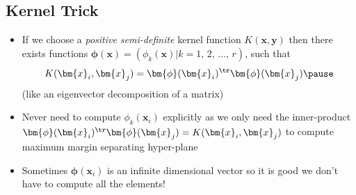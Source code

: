 
\begin{slide}
\section[-1]{Kernel Trick}

\begin{PauseHighLight}
  \begin{itemize}
  \item If we choose a \emph{positive semi-definite} kernel function
    $K(\bm{x}, \bm{y})$ then there exists functions
    $\bm{\phi}(\bm{x}) = (\phi_k(\bm{x})|k=1,\,2,\,\ldots,\,r)$,
    such that
    \begin{align*}
      K(\bm{x}_i, \bm{x}_j) = \bm{\phi}(\bm{x}_i)^\tr
      \bm{\phi}(\bm{x}_j) \pause
    \end{align*}
    (like an eigenvector decomposition of a matrix)\pause
  \item Never need to compute $\phi_k(\bm{x}_i)$ explicitly as we only
    need the inner-product $\bm{\phi}(\bm{x}_i)^\tr
      \bm{\phi}(\bm{x}_j) = K(\bm{x}_i, \bm{x}_j)$ to compute maximum
      margin separating hyper-plane\pause
    \item Sometimes $\bm{\phi}(\bm{x}_i)$ is an infinite dimensional
      vector so it is good we don't have to compute all the elements!\pause
  \end{itemize}
\end{PauseHighLight}

\end{slide}

